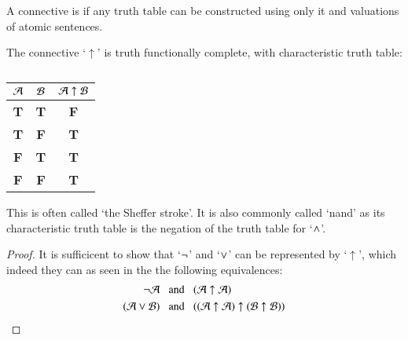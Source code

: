\begin{definition}
    A connective is  if any truth table can be constructed using only it and valuations of atomic sentences.
\end{definition}

\begin{definition}
    The connective `$\uparrow$' is truth functionally complete, with characteristic truth table: 
        \begin{table}[H]
            \centering
            \caption{}
            \begin{tabular}{cc|c}
                $\mathcal{A}$ & $\mathcal{B}$ & $\mathcal{A} \uparrow \mathcal{B}$\\ \hline
                \textbf{T} & \textbf{T} & \textbf{F} \\
                \textbf{T} & \textbf{F} & \textbf{T} \\
                \textbf{F} & \textbf{T} & \textbf{T} \\
                \textbf{F} & \textbf{F} & \textbf{T}
            \end{tabular}
        \end{table}
        This is often called `the Sheffer stroke'. It is also commonly called `nand' as its characteristic truth table is the negation of the truth table for `$\wedge$'.
\end{definition}
\begin{proof}
    It is sufficicent to show that `$\neg$' and `$\vee$' can be represented by `$\uparrow$', which indeed they can as seen in the the following equivalences: 
    \begin{align*}
        \neg\mathcal{A}\;\;&\text{ and }\;\;(\mathcal{A}\uparrow \mathcal{A}) \\
        (\mathcal{A}\vee\mathcal{B})\;\;&\text{ and }\;\;((\mathcal{A}\uparrow\mathcal{A})\uparrow(\mathcal{B}\uparrow\mathcal{B}))
    \end{align*}
\end{proof}



